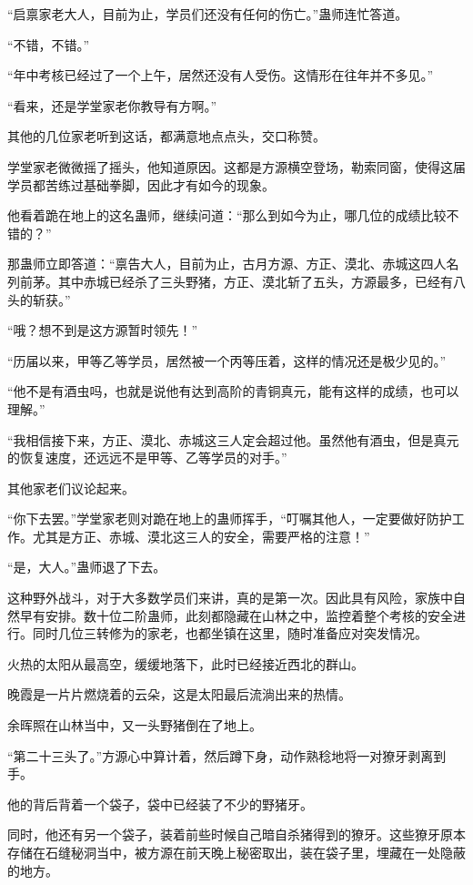 \begin{this_body}
“启禀家老大人，目前为止，学员们还没有任何的伤亡。”蛊师连忙答道。

“不错，不错。”

“年中考核已经过了一个上午，居然还没有人受伤。这情形在往年并不多见。”

“看来，还是学堂家老你教导有方啊。”

其他的几位家老听到这话，都满意地点点头，交口称赞。

学堂家老微微摇了摇头，他知道原因。这都是方源横空登场，勒索同窗，使得这届学员都苦练过基础拳脚，因此才有如今的现象。

他看着跪在地上的这名蛊师，继续问道：“那么到如今为止，哪几位的成绩比较不错的？”

那蛊师立即答道：“禀告大人，目前为止，古月方源、方正、漠北、赤城这四人名列前茅。其中赤城已经杀了三头野猪，方正、漠北斩了五头，方源最多，已经有八头的斩获。”

“哦？想不到是这方源暂时领先！”

“历届以来，甲等乙等学员，居然被一个丙等压着，这样的情况还是极少见的。”

“他不是有酒虫吗，也就是说他有达到高阶的青铜真元，能有这样的成绩，也可以理解。”

“我相信接下来，方正、漠北、赤城这三人定会超过他。虽然他有酒虫，但是真元的恢复速度，还远远不是甲等、乙等学员的对手。”

其他家老们议论起来。

“你下去罢。”学堂家老则对跪在地上的蛊师挥手，“叮嘱其他人，一定要做好防护工作。尤其是方正、赤城、漠北这三人的安全，需要严格的注意！”

“是，大人。”蛊师退了下去。

这种野外战斗，对于大多数学员们来讲，真的是第一次。因此具有风险，家族中自然早有安排。数十位二阶蛊师，此刻都隐藏在山林之中，监控着整个考核的安全进行。同时几位三转修为的家老，也都坐镇在这里，随时准备应对突发情况。

火热的太阳从最高空，缓缓地落下，此时已经接近西北的群山。

晚霞是一片片燃烧着的云朵，这是太阳最后流淌出来的热情。

余晖照在山林当中，又一头野猪倒在了地上。

“第二十三头了。”方源心中算计着，然后蹲下身，动作熟稔地将一对獠牙剥离到手。

他的背后背着一个袋子，袋中已经装了不少的野猪牙。

同时，他还有另一个袋子，装着前些时候自己暗自杀猪得到的獠牙。这些獠牙原本存储在石缝秘洞当中，被方源在前天晚上秘密取出，装在袋子里，埋藏在一处隐蔽的地方。


\end{this_body}
